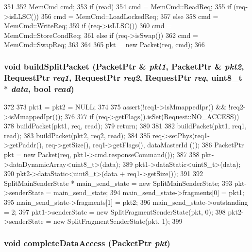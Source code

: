 \begin{DoxyCode}
351 {
352     MemCmd cmd;
353     if (read) {
354         cmd = MemCmd::ReadReq;
355         if (req->isLLSC())
356             cmd = MemCmd::LoadLockedReq;
357     } else {
358         cmd = MemCmd::WriteReq;
359         if (req->isLLSC()) {
360             cmd = MemCmd::StoreCondReq;
361         } else if (req->isSwap()) {
362             cmd = MemCmd::SwapReq;
363         }
364     }
365     pkt = new Packet(req, cmd);
366 }
\end{DoxyCode}
\hypertarget{classTimingSimpleCPU_a1a7d0ff7c4efb80ffd4f53439b2291f8}{
\subsubsection[{buildSplitPacket}]{\setlength{\rightskip}{0pt plus 5cm}void buildSplitPacket ({\bf PacketPtr} \& {\em pkt1}, \/  {\bf PacketPtr} \& {\em pkt2}, \/  {\bf RequestPtr} {\em req1}, \/  {\bf RequestPtr} {\em req2}, \/  {\bf RequestPtr} {\em req}, \/  uint8\_\-t $\ast$ {\em data}, \/  bool {\em read})}}
\label{classTimingSimpleCPU_a1a7d0ff7c4efb80ffd4f53439b2291f8}



\begin{DoxyCode}
372 {
373     pkt1 = pkt2 = NULL;
374 
375     assert(!req1->isMmappedIpr() && !req2->isMmappedIpr());
376 
377     if (req->getFlags().isSet(Request::NO_ACCESS)) {
378         buildPacket(pkt1, req, read);
379         return;
380     }
381 
382     buildPacket(pkt1, req1, read);
383     buildPacket(pkt2, req2, read);
384 
385     req->setPhys(req1->getPaddr(), req->getSize(), req1->getFlags(), dataMasterId
      ());
386     PacketPtr pkt = new Packet(req, pkt1->cmd.responseCommand());
387 
388     pkt->dataDynamicArray<uint8_t>(data);
389     pkt1->dataStatic<uint8_t>(data);
390     pkt2->dataStatic<uint8_t>(data + req1->getSize());
391 
392     SplitMainSenderState * main_send_state = new SplitMainSenderState;
393     pkt->senderState = main_send_state;
394     main_send_state->fragments[0] = pkt1;
395     main_send_state->fragments[1] = pkt2;
396     main_send_state->outstanding = 2;
397     pkt1->senderState = new SplitFragmentSenderState(pkt, 0);
398     pkt2->senderState = new SplitFragmentSenderState(pkt, 1);
399 }
\end{DoxyCode}
\hypertarget{classTimingSimpleCPU_a0f7f0d3412bbf494cd3d0c0f48e5fcf2}{
\subsubsection[{completeDataAccess}]{\setlength{\rightskip}{0pt plus 5cm}void completeDataAccess ({\bf PacketPtr} {\em pkt})}}
\label{classTimingSimpleCPU_a0f7f0d3412bbf494cd3d0c0f48e5fcf2}



